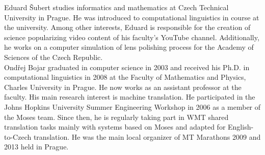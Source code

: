 \documentclass[11pt]{article}
\begin{document}
Eduard \v{S}ubert studies informatics and mathematics at Czech Technical University in Prague. He was introduced to computational linguistics in course at the university. Among other interests, Eduard is responsible for the creation of science popularizing video content of his faculty's YouTube channel. Additionally, he works on a computer simulation of lens polishing process for the Academy of Sciences of the Czech Republic.
\\[3cm]
Ond\v{r}ej Bojar graduated in computer science in 2003 and received his Ph.D. in computational linguistics in 2008 at the Faculty of Mathematics and Physics, Charles University in Prague. He now works as an assistant professor at the faculty. His main research interest is machine translation. He participated in the Johns Hopkins University Summer Engineering Workshop in 2006 as a member of the Moses team. Since then, he is regularly taking part in WMT shared translation tasks mainly with systems based on Moses and adapted for English-to-Czech translation. He was the main local organizer of MT Marathons 2009 and 2013 held in Prague.
\end{document}
